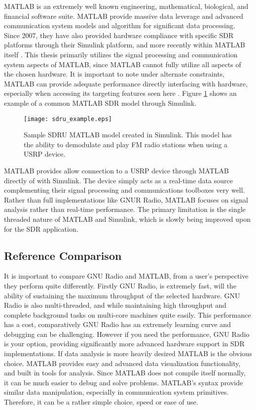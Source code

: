 MATLAB is an extremely well known engineering, mathematical, biological, and financial software suite.  MATLAB provide massive data leverage and advanced communication system models and algorithm for significant data processing.  Since 2007, they have also provided hardware compliance with specific SDR platforms through their Simulink platform, and more recently within MATLAB itself \cite{matlabsdru}.  This thesis primarily utilizes the signal processing and communication system aspects of MATLAB, since MATLAB cannot fully utilize all aspects of the chosen hardware.  It is important to note under alternate constraints, MATLAB can provide adequate performance directly interfacing with hardware, especially when accessing its targeting features seen here \cite{matlabtargeting}.  Figure \ref{sdru_example} shows an example of a common MATLAB SDR model through Simulink.\\

\begin{figure}[!ht]\label{sdru_example}
\centering
\texttt{[image: sdru\_example.eps]}
\caption{Sample SDRU MATLAB model created in Simulink.  This model has the ability to demodulate and play FM radio stations when using a USRP device.}
\end{figure}

MATLAB provides allow connection to a USRP device through MATLAB directly of with Simulink.  The device simply acts as a real-time data source complementing their signal processing and communications toolboxes very well.  Rather than full implementations like GNUR Radio, MATLAB focuses on signal analysis rather than real-time performance.  The primary limitation is the single threaded nature of MATLAB and Simulink, which is slowly being improved upon for the SDR application.\\

\subsection{Reference Comparison}

It is important to compare GNU Radio and MATLAB, from a user's perspective they perform quite differently.  Firstly GNU Radio, is extremely fast, will the ability of sustaining the maximum throughput of the selected hardware.  GNU Radio is also multi-threaded, and while maintaining high throughput and complete background tasks on multi-core machines quite easily.  This performance has a cost, comparatively GNU Radio has an extremely learning curve and debugging can be challenging.  However if you need the performance, GNU Radio is your option, providing significantly more advanced hardware support in SDR implementations.  If data analysis is more heavily desired MATLAB is the obvious choice.  MATLAB provides easy and advanced data visualization functionality, and built in tools for analysis.  Since MATLAB does not compile itself normally, it can be much easier to debug and solve problems.  MATLAB's syntax provide similar data manipulation, especially in communication system primitives.  Therefore, it can be a rather simple choice, speed or ease of use.\\ 

